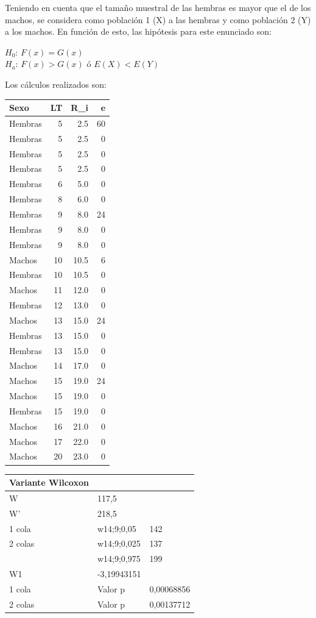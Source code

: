 \documentclass[]{book}
\theoremstyle{definition}
\theoremstyle{definition}
\theoremstyle{definition}
\theoremstyle{remark}
\begin{document}
Teniendo en cuenta que el tamaño muestral de las hembras es mayor que el
de los machos, se considera como población 1 (X) a las hembras y como
población 2 (Y) a los machos. En función de esto, las hipótesis para
este enunciado son:

\(H_0\): \(F(x)=G(x)\)\\
\(H_a\): \(F(x)>G(x)\) ó \(E(X)<E(Y)\)

Los cálculos realizados son:

\begin{tabular}{l|r|r|r}
\hline
Sexo & LT & R\_i & e\\
\hline
Hembras & 5 & 2.5 & 60\\
\hline
Hembras & 5 & 2.5 & 0\\
\hline
Hembras & 5 & 2.5 & 0\\
\hline
Hembras & 5 & 2.5 & 0\\
\hline
Hembras & 6 & 5.0 & 0\\
\hline
Hembras & 8 & 6.0 & 0\\
\hline
Hembras & 9 & 8.0 & 24\\
\hline
Hembras & 9 & 8.0 & 0\\
\hline
Hembras & 9 & 8.0 & 0\\
\hline
Machos & 10 & 10.5 & 6\\
\hline
Hembras & 10 & 10.5 & 0\\
\hline
Machos & 11 & 12.0 & 0\\
\hline
Hembras & 12 & 13.0 & 0\\
\hline
Machos & 13 & 15.0 & 24\\
\hline
Hembras & 13 & 15.0 & 0\\
\hline
Hembras & 13 & 15.0 & 0\\
\hline
Machos & 14 & 17.0 & 0\\
\hline
Machos & 15 & 19.0 & 24\\
\hline
Machos & 15 & 19.0 & 0\\
\hline
Hembras & 15 & 19.0 & 0\\
\hline
Machos & 16 & 21.0 & 0\\
\hline
Machos & 17 & 22.0 & 0\\
\hline
Machos & 20 & 23.0 & 0\\
\hline
\end{tabular}

\begin{longtable}[]{@{}lll@{}}
\toprule
Variante Wilcoxon & &\tabularnewline
\midrule
\endhead
W & 117,5 &\tabularnewline
W' & 218,5 &\tabularnewline
1 cola & w14;9;0,05 & 142\tabularnewline
2 colas & w14;9;0,025 & 137\tabularnewline
& w14;9;0,975 & 199\tabularnewline
W1 & -3,19943151 &\tabularnewline
1 cola & Valor p & 0,00068856\tabularnewline
2 colas & Valor p & 0,00137712\tabularnewline
\bottomrule
\end{longtable}
\end{document}
